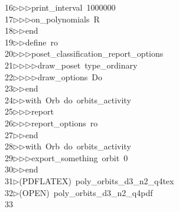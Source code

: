 \begin{tabbing}
16\>$\triangleright$\>$\triangleright$\>$\triangleright$\>print\_interval\ 1000000\ \\[0pt]
17\>$\triangleright$\>$\triangleright$\>$\triangleright$\>on\_polynomials\ R\ \\[0pt]
18\>$\triangleright$\>$\triangleright$\>end\ \\[0pt]
19\>$\triangleright$\>$\triangleright$\>define\ ro\ \\[0pt]
20\>$\triangleright$\>$\triangleright$\>$\triangleright$\>poset\_classification\_report\_options\ \\[0pt]
21\>$\triangleright$\>$\triangleright$\>$\triangleright$\>$\triangleright$\>draw\_poset\ type\_ordinary\ \\[0pt]
22\>$\triangleright$\>$\triangleright$\>$\triangleright$\>$\triangleright$\>draw\_options\ Do\ \\[0pt]
23\>$\triangleright$\>$\triangleright$\>end\ \\[0pt]
24\>$\triangleright$\>$\triangleright$\>with\ Orb\ do\ orbits\_activity\ \\[0pt]
25\>$\triangleright$\>$\triangleright$\>$\triangleright$\>report\ \ \\[0pt]
26\>$\triangleright$\>$\triangleright$\>$\triangleright$\>report\_options\ ro\ \\[0pt]
27\>$\triangleright$\>$\triangleright$\>end\ \\[0pt]
28\>$\triangleright$\>$\triangleright$\>with\ Orb\ do\ orbits\_activity\ \\[0pt]
29\>$\triangleright$\>$\triangleright$\>$\triangleright$\>export\_something\ orbit\ 0\ \\[0pt]
30\>$\triangleright$\>$\triangleright$\>end\\[0pt]
31\>$\triangleright$\>(PDFLATEX)\ poly\_orbits\_d3\_n2\_q4tex\\[0pt]
32\>$\triangleright$\>(OPEN)\ poly\_orbits\_d3\_n2\_q4pdf\\[0pt]
33\>\end{tabbing}
